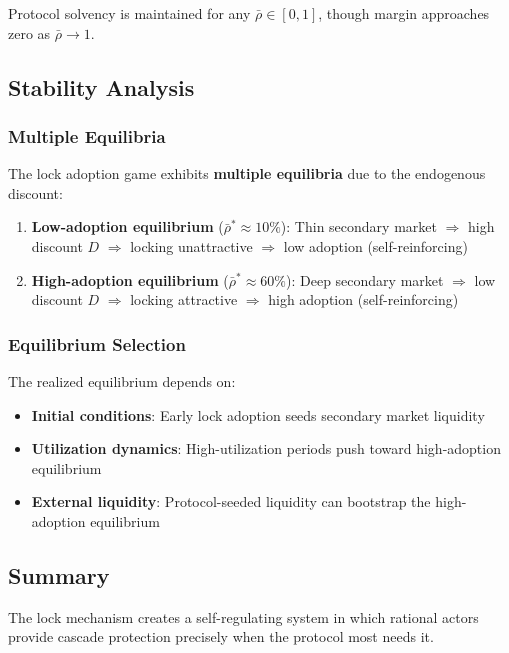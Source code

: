 \documentclass[10pt,a4paper,twocolumn]{article}
\theoremstyle{definition}
\theoremstyle{plain}
\theoremstyle{remark}
\begin{document}
Protocol solvency is maintained for any $\bar{\rho} \in [0, 1]$, though margin approaches zero as $\bar{\rho} \to 1$.

\subsection{Stability Analysis}

\subsubsection{Multiple Equilibria}

The lock adoption game exhibits \textbf{multiple equilibria} due to the endogenous discount:

\begin{enumerate}
    \item \textbf{Low-adoption equilibrium} ($\bar{\rho}^* \approx 10\%$): Thin secondary market $\Rightarrow$ high discount $D$ $\Rightarrow$ locking unattractive $\Rightarrow$ low adoption (self-reinforcing)

    \item \textbf{High-adoption equilibrium} ($\bar{\rho}^* \approx 60\%$): Deep secondary market $\Rightarrow$ low discount $D$ $\Rightarrow$ locking attractive $\Rightarrow$ high adoption (self-reinforcing)
\end{enumerate}

\subsubsection{Equilibrium Selection}

The realized equilibrium depends on:
\begin{itemize}
    \item \textbf{Initial conditions}: Early lock adoption seeds secondary market liquidity
    \item \textbf{Utilization dynamics}: High-utilization periods push toward high-adoption equilibrium
    \item \textbf{External liquidity}: Protocol-seeded liquidity can bootstrap the high-adoption equilibrium
\end{itemize}

\subsection{Summary}

The lock mechanism creates a self-regulating system in which rational actors provide cascade protection precisely when the protocol most needs it.
\end{document}
